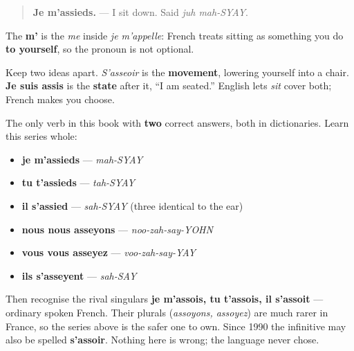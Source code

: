 \begin{quote}
\textbf{Je m'assieds.} — I sit down. Said \emph{juh mah-SYAY}.
\end{quote}

The \textbf{m'} is the \emph{me} inside \emph{je m'appelle}: French treats sitting as something you do \textbf{to yourself}, so the pronoun is not optional.

Keep two ideas apart. \emph{S'asseoir} is the \textbf{movement}, lowering yourself into a chair. \textbf{Je suis assis} is the \textbf{state} after it, \textquotedblleft{}I am seated.\textquotedblright{} English lets \emph{sit} cover both; French makes you choose.

\begin{grammarlens}[title={Grammar Lens: one verb, two accepted sets}]
The only verb in this book with \textbf{two} correct answers, both in dictionaries. Learn this series whole:

\begin{itemize}
\raggedright
  \item \textbf{je m'assieds} — \emph{mah-SYAY}
  \item \textbf{tu t'assieds} — \emph{tah-SYAY}
  \item \textbf{il s'assied} — \emph{sah-SYAY} (three identical to the ear)
  \item \textbf{nous nous asseyons} — \emph{noo-zah-say-YOHN}
  \item \textbf{vous vous asseyez} — \emph{voo-zah-say-YAY}
  \item \textbf{ils s'asseyent} — \emph{sah-SAY}
\end{itemize}

Then recognise the rival singulars \textbf{je m'assois, tu t'assois, il s'assoit} — ordinary spoken French. Their plurals (\emph{assoyons, assoyez}) are much rarer in France, so the series above is the safer one to own. Since 1990 the infinitive may also be spelled \textbf{s'assoir}. Nothing here is wrong; the language never chose.
\end{grammarlens}

